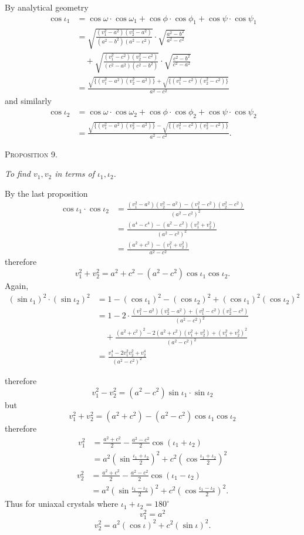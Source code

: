 \documentclass[11pt]{article}
\newcommand{\proposition}[1]{\vspace{0.9em}\begin{center}{\scshape Proposition #1.}\end{center}\vspace{0.2em}}
\newcommand{\sourcepage}[1]{\marginpar{\scriptsize p.~#1}}
\begin{document}
By analytical geometry
\begin{align*}
\cos\iota_1
&=\cos\omega\cdot\cos\omega_1+\cos\phi\cdot\cos\phi_1+\cos\psi\cdot\cos\psi_1\\
&=\sqrt{\frac{(v_1^2-a^2)(v_2^2-a^2)}{(a^2-b^2)(a^2-c^2)}}\cdot\sqrt{\frac{a^2-b^2}{a^2-c^2}}\\
&\quad+\sqrt{\frac{(v_1^2-c^2)(v_2^2-c^2)}{(c^2-a^2)(c^2-b^2)}}\cdot\sqrt{\frac{c^2-b^2}{c^2-a^2}}\\
&=\frac{\sqrt{\{(v_1^2-a^2)(v_2^2-a^2)\}}+\sqrt{\{(v_1^2-c^2)(v_2^2-c^2)\}}}{a^2-c^2}
\end{align*}
and similarly
\begin{align*}
\cos\iota_2
&=\cos\omega\cdot\cos\omega_2+\cos\phi\cdot\cos\phi_2+\cos\psi\cdot\cos\psi_2\\
&=\frac{\sqrt{\{(v_1^2-a^2)(v_2^2-a^2)\}}-\sqrt{\{(v_1^2-c^2)(v_2^2-c^2)\}}}{a^2-c^2}.
\end{align*}

\proposition{9}

\emph{To find $v_1,v_2$ in terms of $\iota_1,\iota_2$.}

By the last proposition
\begin{align*}
\cos\iota_1\cdot\cos\iota_2
&=\frac{(v_1^2-a^2)(v_2^2-a^2)-(v_1^2-c^2)(v_2^2-c^2)}{(a^2-c^2)^2}\\
&=\frac{(a^4-c^4)-(a^2-c^2)(v_1^2+v_2^2)}{(a^2-c^2)^2}\\
&=\frac{(a^2+c^2)-(v_1^2+v_2^2)}{a^2-c^2}
\end{align*}
therefore
\[
 v_1^2+v_2^2=a^2+c^2-(a^2-c^2)\cos\iota_1\cos\iota_2.
\]
Again,
\begin{align*}
(\sin\iota_1)^2\cdot(\sin\iota_2)^2
&=1-(\cos\iota_1)^2-(\cos\iota_2)^2+(\cos\iota_1)^2(\cos\iota_2)^2\\
&=1-2\cdot\frac{(v_1^2-a^2)(v_2^2-a^2)+(v_1^2-c^2)(v_2^2-c^2)}{(a^2-c^2)^2}\\
&\quad+\frac{(a^2+c^2)^2-2(a^2+c^2)(v_1^2+v_2^2)+(v_1^2+v_2^2)^2}{(a^2-c^2)^2}\\
&=\frac{v_1^4-2v_1^2v_2^2+v_2^4}{(a^2-c^2)^2}
\end{align*}

\sourcepage{9}
therefore
\[
 v_1^2-v_2^2=(a^2-c^2)\sin\iota_1\cdot\sin\iota_2
\]
but
\[
 v_1^2+v_2^2=(a^2+c^2)-(a^2-c^2)\cos\iota_1\cos\iota_2
\]
therefore
\begin{align*}
 v_1^2
&=\frac{a^2+c^2}{2}-\frac{a^2-c^2}{2}\cos(\iota_1+\iota_2)\\
&=a^2\left(\sin\frac{\iota_1+\iota_2}{2}\right)^2
+c^2\left(\cos\frac{\iota_1+\iota_2}{2}\right)^2
\end{align*}
\begin{align*}
 v_2^2
&=\frac{a^2+c^2}{2}-\frac{a^2-c^2}{2}\cos(\iota_1-\iota_2)\\
&=a^2\left(\sin\frac{\iota_1-\iota_2}{2}\right)^2
+c^2\left(\cos\frac{\iota_1-\iota_2}{2}\right)^2.
\end{align*}
Thus for uniaxal crystals where $\iota_1+\iota_2=180^\circ$
\[
 v_1^2=a^2
\]
\[
 v_2^2=a^2(\cos\iota)^2+c^2(\sin\iota)^2.
\]
\end{document}
